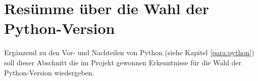 \documentclass[Bachelorarbeit.tex]{subfiles}
\begin{document}
\section{Resümme über die Wahl der Python-Version}

Ergänzend zu den Vor- und Nachteilen von Python (siehe Kapitel \ref{para:python}) soll dieser Abschnitt die im Projekt gewonnen Erkenntnisse für die Wahl der Python-Version wiedergeben. 
\end{document}
